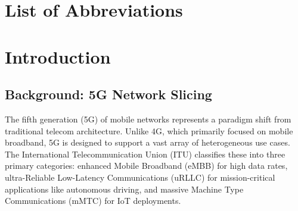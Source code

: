 \documentclass[12pt]{article}
\newcommand{\setchapterheader}[1]{%
  \fancyhead[L]{\textit{#1}}%
}
\begin{document}
\section*{List of Abbreviations}
\begin{acronym}[uRLLC] %
\end{acronym}

\clearpage

\setcounter{page}{1}
\pagestyle{fancy}





\pagestyle{fancy}
\setchapterheader{Introduction}
\section{Introduction}

\subsection{Background: 5G Network Slicing}
The fifth generation (5G) of mobile networks represents a paradigm shift from traditional telecom architecture. Unlike 4G, which primarily focused on mobile broadband, 5G is designed to support a vast array of heterogeneous use cases. The International Telecommunication Union (ITU) classifies these into three primary categories: enhanced Mobile Broadband (eMBB) for high data rates, ultra-Reliable Low-Latency Communications (uRLLC) for mission-critical applications like autonomous driving, and massive Machine Type Communications (mMTC) for IoT deployments.
\end{document}
